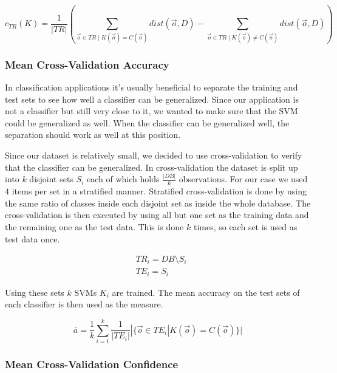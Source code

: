 \documentclass[pdftex,12pt,a4paper]{report}
\begin{document}
\begin{equation}
c_{TR}(K) = \frac{1}{|TR|} (\sum_{\vec{o} \in TR \mid K(\vec{o}) = C(\vec{o})} dist(\vec{o}, D) - \sum_{\vec{o} \in TR \mid K(\vec{o}) \neq C(\vec{o})} dist(\vec{o}, D))
\end{equation}

\subsubsection{Mean Cross-Validation Accuracy}
\label{subsub:cross-validation-accuracy}

In classification applications it's usually beneficial to separate the training and test sets to see how well a
classifier can be generalized. Since our application is not a classifier but still very close to it, we wanted
to make sure that the SVM could be generalized as well. When the classifier can be generalized well, the separation
should work as well at this position.

Since our dataset is relatively small, we decided to use cross-validation to verify that the classifier can be
generalized. In cross-validation the dataset is split up into $k$ disjoint sets $S_i$ each of which holds $\frac{|DB|}{k}$ observations. For our case we used $4$ items per set in a stratified manner. Stratified cross-validation is done by using the same ratio of classes inside each disjoint set as inside the whole database. The cross-validation is then
executed by using all but one set as the training data and the remaining one as the test data. This is done $k$ times, so each set is used as test data once.

\begin{equation}
\begin{split}
& TR_i = DB \setminus S_i \\
& TE_i = S_i 
\end{split}
\end{equation}

Using these sets $k$ SVMs $K_i$ are trained. The mean accuracy on the test sets of each classifier is then used
as the measure.

\begin{equation}
\bar{a} = \frac{1}{k} \sum_{i=1}^k \frac{1}{|TE_i|} | \{\vec{o} \in TE_i | K(\vec{o}) = C(\vec{o}) \}| 
\end{equation}

\subsubsection{Mean Cross-Validation Confidence}
\label{subsub:cross-validation-confidence}
\end{document}
